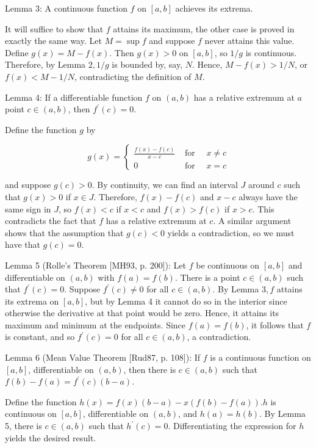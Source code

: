 \documentclass[10pt]{article}
\begin{document}
Lemma 3: A continuous function $f$ on $[a, b]$ achieves its extrema.

It will suffice to show that $f$ attains its maximum, the other case is proved in exactly the same way. Let $M=\sup f$ and suppose $f$ never attains this value. Define $g(x)=M-f(x)$. Then $g(x)>0$ on $[a, b]$, so $1 / g$ is continuous. Therefore, by Lemma $2,1 / g$ is bounded by, say, $N$. Hence, $M-f(x)>1 / N$, or $f(x)<M-1 / N$, contradicting the definition of $M$.

Lemma 4: If a differentiable function $f$ on $(a, b)$ has a relative extremum at $a$ point $c \in(a, b)$, then $f^{\prime}(c)=0$.

Define the function $g$ by

$$
g(x)=\left\{\begin{array}{ccc}
\frac{f(x)-f(c)}{x-c} & \text { for } \quad x \neq c \\
0 & \text { for } \quad x=c
\end{array}\right.
$$

and suppose $g(c)>0$. By continuity, we can find an interval $J$ around $c$ such that $g(x)>0$ if $x \in J$. Therefore, $f(x)-f(c)$ and $x-c$ always have the same sign in $J$, so $f(x)<c$ if $x<c$ and $f(x)>f(c)$ if $x>c$. This contradicts the fact that $f$ has a relative extremum at $c$. A similar argument shows that the assumption that $g(c)<0$ yields a contradiction, so we must have that $g(c)=0$.

Lemma 5 (Rolle's Theorem [MH93, p. 200]): Let $f$ be continuous on $[a, b]$ and differentiable on $(a, b)$ with $f(a)=f(b)$. There is a point $c \in(a, b)$ such that $f^{\prime}(c)=0$. Suppose $f^{\prime}(c) \neq 0$ for all $c \in(a, b)$. By Lemma $3, f$ attains its extrema on $[a, b]$, but by Lemma 4 it cannot do so in the interior since otherwise the derivative at that point would be zero. Hence, it attains its maximum and minimum at the endpoints. Since $f(a)=f(b)$, it follows that $f$ is constant, and so $f^{\prime}(c)=0$ for all $c \in(a, b)$, a contradiction.

Lemma 6 (Mean Value Theorem [Rud87, p. 108]): If $f$ is a continuous function on $[a, b]$, differentiable on $(a, b)$, then there is $c \in(a, b)$ such that $f(b)-f(a)=f^{\prime}(c)(b-a)$.

Define the function $h(x)=f(x)(b-a)-x(f(b)-f(a)) . h$ is continuous on $[a, b]$, differentiable on $(a, b)$, and $h(a)=h(b)$. By Lemma 5, there is $c \in(a, b)$ such that $h^{\prime}(c)=0$. Differentiating the expression for $h$ yields the desired result.
\end{document}
